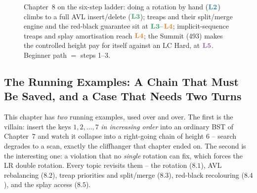 \begin{figure}[H]
\centering
{}
\caption*{Chapter~8 on the six-step ladder: doing a rotation by hand ($\lv2$) climbs to a full AVL
insert/delete ($\lv3$); treaps and their split/merge engine and the red-black guarantee sit at
$\lv3$--$\lv4$; implicit-sequence treaps and splay amortisation reach $\lv4$; the Summit (493) makes
the controlled height pay for itself against an LC Hard, at $\lv5$. Beginner path $=$ steps 1--3.}
\end{figure}

\subsection*{The Running Examples: A Chain That Must Be Saved, and a Case That Needs Two Turns}

This chapter has \emph{two} running examples, used over and over. The first is the villain: insert
the keys $1,2,\dots,7$ \emph{in increasing order} into an ordinary BST of Chapter~7 and watch it
collapse into a right-going chain of height $6$ -- search degrades to a scan, exactly the cliffhanger
that chapter ended on. The second is the interesting one: a violation that no \emph{single} rotation
can fix, which forces the LR double rotation. Every topic revisits them -- the rotation ($8.1$), AVL
rebalancing ($8.2$), treap priorities and split/merge ($8.3$), red-black recolouring ($8.4$), and the
splay access ($8.5$).

